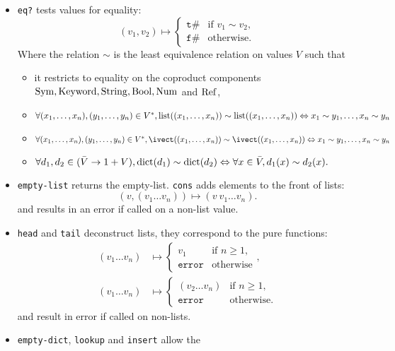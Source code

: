 \begin{itemize}
\item \texttt{eq?} tests values for equality:
  \[
    (v_1, v_2) \mapsto
    \begin{cases}
      \mathtt{t}\# & \text{if } v_1 \sim v_2,\\
      \mathtt{f}\# & \text{otherwise.}
    \end{cases}
  \]
  Where the relation $\sim$ is the least equivalence relation on values $V$ such
  that
  \begin{itemize}
  \item
    it restricts to equality on the coproduct components $\mathrm{Sym}, \mathrm{Keyword}, \mathrm{String},
    \mathrm{Bool}, \mathrm{Num}$ and $\mathrm{Ref}$,
  \item
    $\forall (x_1, \ldots, x_n), (y_1, \ldots, y_n) \in V^*, \mathrm{list}((x_1, \ldots,
    x_n)) \sim \mathrm{list}((x_1, \ldots, x_n)) \Leftrightarrow x_1 \sim y_1, \ldots, x_n
    \sim y_n$
  \item
    $\forall (x_1, \ldots, x_n), (y_1, \ldots, y_n) \in V^*, \ivect((x_1, \ldots,
    x_n)) \sim \ivect((x_1, \ldots, x_n)) \Leftrightarrow x_1 \sim y_1, \ldots, x_n
    \sim y_n$
  \item
    $\forall d_1, d_2 \in (\bar V \to 1 + V), \mathrm{dict}(d_1) \sim \mathrm{dict}(d_2)
    \Leftrightarrow \forall x \in \bar V, d_1(x) \sim d_2(x).$
  \end{itemize}
\item
  \texttt{empty-list} returns the empty-list.
  \texttt{cons} adds elements to the front of lists:
  \[
    (v, (v_1 \ldots v_n)) \mapsto (v \ v_1 \ldots v_n).
  \]
  and results in an error if called on a non-list value.
\item
  \texttt{head} and \texttt{tail} deconstruct lists, they correspond to the pure
  functions:
  \begin{align*}
    (v_1 \ldots v_n) &\mapsto
    \begin{cases}
      v_1 & \text{if } n \geq 1,\\
      \mathtt{error} & \text{otherwise}
    \end{cases},\\
    (v_1 \ldots v_n) &\mapsto
    \begin{cases}
      (v_2 \ldots v_n) & \text{if } n \geq 1,\\
      \mathtt{error} & \text{otherwise.}
    \end{cases}
  \end{align*}
  and result in error if called on non-lists.
\item \texttt{empty-dict}, \texttt{lookup} and \texttt{insert} allow the

\end{itemize}
